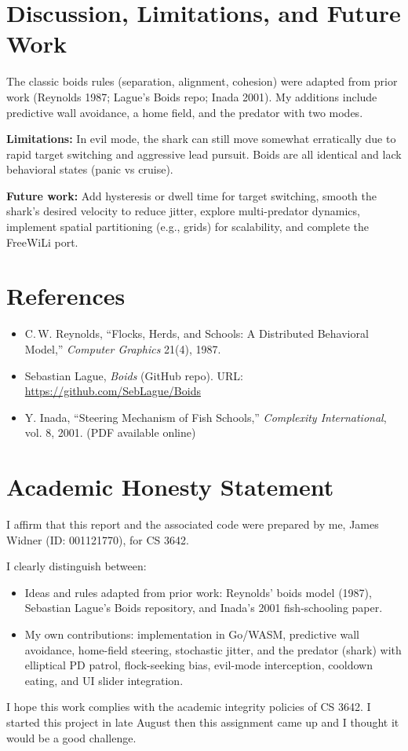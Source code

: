 \documentclass[11pt]{article}
\begin{document}
\newpage

\section*{Discussion, Limitations, and Future Work}
The classic boids rules (separation, alignment, cohesion) were adapted from prior work (Reynolds 1987; Lague's Boids repo; Inada 2001). My additions include predictive wall avoidance, a home field, and the predator with two modes.

\textbf{Limitations:} In evil mode, the shark can still move somewhat erratically due to rapid target switching and aggressive lead pursuit. Boids are all identical and lack behavioral states (panic vs cruise).

\textbf{Future work:} Add hysteresis or dwell time for target switching, smooth the shark's desired velocity to reduce jitter, explore multi-predator dynamics, implement spatial partitioning (e.g., grids) for scalability, and complete the FreeWiLi port.

\section*{References}
\begin{itemize}[leftmargin=1.25em]
  \item C.\,W. Reynolds, ``Flocks, Herds, and Schools: A Distributed Behavioral Model,'' \emph{Computer Graphics} 21(4), 1987.
  \item Sebastian Lague, \emph{Boids} (GitHub repo). URL: \url{https://github.com/SebLague/Boids}
  \item Y. Inada, ``Steering Mechanism of Fish Schools,'' \emph{Complexity International}, vol. 8, 2001. (PDF available online)
\end{itemize}
\section*{Academic Honesty Statement}
I affirm that this report and the associated code were prepared by me,
James Widner (ID: 001121770), for CS 3642. 

I clearly distinguish between:
\begin{itemize}[leftmargin=1.25em]
  \item Ideas and rules adapted from prior work: Reynolds' boids model (1987),
  Sebastian Lague's Boids repository, and Inada's 2001 fish-schooling paper.
  \item My own contributions: implementation in Go/WASM, predictive wall
  avoidance, home-field steering, stochastic jitter, and the predator (shark)
  with elliptical PD patrol, flock-seeking bias, evil-mode interception,
  cooldown eating, and UI slider integration.
\end{itemize}

I hope this work complies with the academic integrity policies of CS 3642. I
started this project in late August then this assignment came up and I thought it would be a good challenge.
\end{document}
